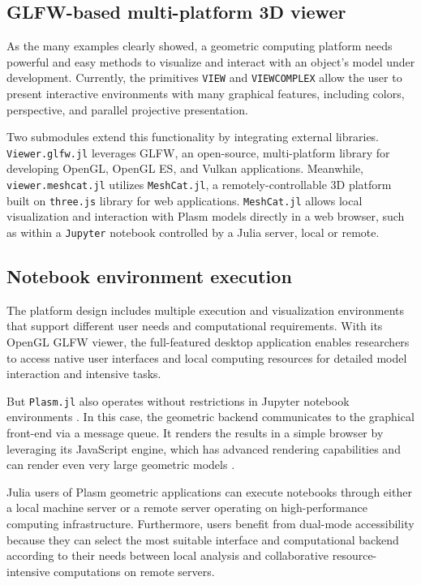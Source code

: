\documentclass{juliacon}
\begin{document}
\subsection{GLFW-based multi-platform 3D viewer}
\label{subsec:title_auth}

As the many examples clearly showed, a geometric computing platform needs powerful and easy methods to visualize and interact with an object’s model under development. Currently, the primitives {\tt VIEW} and {\tt VIEWCOMPLEX} allow the user to present interactive environments with many graphical features, including colors, perspective, and parallel projective presentation.

Two submodules extend this functionality by integrating external libraries. {\tt Viewer.glfw.jl} leverages GLFW, an open-source, multi-platform library for developing OpenGL, OpenGL ES, and Vulkan applications. Meanwhile, {\tt viewer.meshcat.jl} utilizes {\tt MeshCat.jl}, a remotely-controllable 3D platform built on {\tt three.js} library for web applications. {\tt MeshCat.jl} allows local visualization and interaction with Plasm models directly in a web browser, such as within a {\tt Jupyter} notebook controlled by a Julia server, local or remote.

\subsection{Notebook environment execution}
\label{subsec:title_auth}

The platform design includes multiple execution and visualization environments that support different user needs and computational requirements.
With its OpenGL GLFW viewer, the full-featured desktop application enables researchers to access native user interfaces and local computing resources for detailed model interaction and intensive tasks.

But {\tt Plasm.jl} also operates without restrictions in Jupyter notebook environments \cite{JUP}. In this case, the geometric backend communicates to the graphical front-end via a message queue. It renders the results in a simple browser by leveraging its JavaScript engine, which has advanced rendering capabilities and can render even very large geometric models \cite{UP20}.

Julia users of Plasm geometric applications can execute notebooks through either a local machine server or a remote server operating on high-performance computing infrastructure. Furthermore, users benefit from dual-mode accessibility because they can select the most suitable interface and computational backend according to their needs between local analysis and collaborative resource-intensive computations on remote servers.
\end{document}
